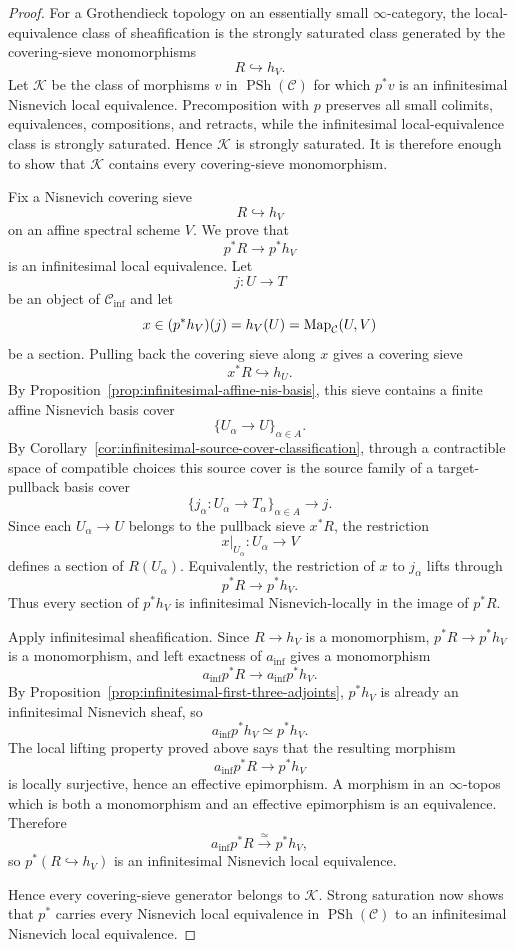 \begin{proof}
For a Grothendieck topology on an essentially small $\infty$-category, the
local-equivalence class of sheafification is the strongly saturated class
generated by the covering-sieve monomorphisms
\[
    R\hookrightarrow h_V.
\]
Let $\mathcal K$ be the class of morphisms $v$ in
$\operatorname{PSh}(\mathcal C)$ for which $p^*v$ is an infinitesimal
Nisnevich local equivalence.  Precomposition with $p$ preserves all small
colimits, equivalences, compositions, and retracts, while the infinitesimal
local-equivalence class is strongly saturated.  Hence $\mathcal K$ is
strongly saturated.  It is therefore enough to show that $\mathcal K$
contains every covering-sieve monomorphism.

Fix a Nisnevich covering sieve
\[
    R\hookrightarrow h_V
\]
on an affine spectral scheme $V$.  We prove that
\[
    p^*R\longrightarrow p^*h_V
\]
is an infinitesimal local equivalence.  Let
\[
    j:U\longrightarrow T
\]
be an object of $\mathcal C_{\mathrm{inf}}$ and let
\[
    x\in(p^*h_V)(j)=h_V(U)=\operatorname{Map}_{\mathcal C}(U,V)
\]
be a section.  Pulling back the covering sieve along $x$ gives a covering
sieve
\[
    x^*R\hookrightarrow h_U.
\]
By Proposition~\ref{prop:infinitesimal-affine-nis-basis}, this sieve contains
a finite affine Nisnevich basis cover
\[
    \{U_\alpha\longrightarrow U\}_{\alpha\in A}.
\]
By Corollary~\ref{cor:infinitesimal-source-cover-classification}, through a
contractible space of compatible choices this source cover is the source
family of a target-pullback basis cover
\[
    \{j_\alpha:U_\alpha\longrightarrow T_\alpha\}_{\alpha\in A}
    \longrightarrow
    j.
\]
Since each $U_\alpha\to U$ belongs to the pullback sieve $x^*R$, the
restriction
\[
    x|_{U_\alpha}:U_\alpha\longrightarrow V
\]
defines a section of $R(U_\alpha)$.  Equivalently, the restriction of $x$ to
$j_\alpha$ lifts through
\[
    p^*R\longrightarrow p^*h_V.
\]
Thus every section of $p^*h_V$ is infinitesimal Nisnevich-locally in the
image of $p^*R$.

Apply infinitesimal sheafification.  Since $R\to h_V$ is a monomorphism,
$p^*R\to p^*h_V$ is a monomorphism, and left exactness of
$a_{\mathrm{inf}}$ gives a monomorphism
\[
    a_{\mathrm{inf}}p^*R
    \longrightarrow
    a_{\mathrm{inf}}p^*h_V.
\]
By Proposition~\ref{prop:infinitesimal-first-three-adjoints},
$p^*h_V$ is already an infinitesimal Nisnevich sheaf, so
\[
    a_{\mathrm{inf}}p^*h_V\simeq p^*h_V.
\]
The local lifting property proved above says that the resulting morphism
\[
    a_{\mathrm{inf}}p^*R\longrightarrow p^*h_V
\]
is locally surjective, hence an effective epimorphism.  A morphism in an
$\infty$-topos which is both a monomorphism and an effective epimorphism is
an equivalence.  Therefore
\[
    a_{\mathrm{inf}}p^*R\xrightarrow{\simeq}p^*h_V,
\]
so $p^*(R\hookrightarrow h_V)$ is an infinitesimal Nisnevich local
equivalence.

Hence every covering-sieve generator belongs to $\mathcal K$.  Strong
saturation now shows that $p^*$ carries every Nisnevich local equivalence in
$\operatorname{PSh}(\mathcal C)$ to an infinitesimal Nisnevich local
equivalence.
\end{proof}

